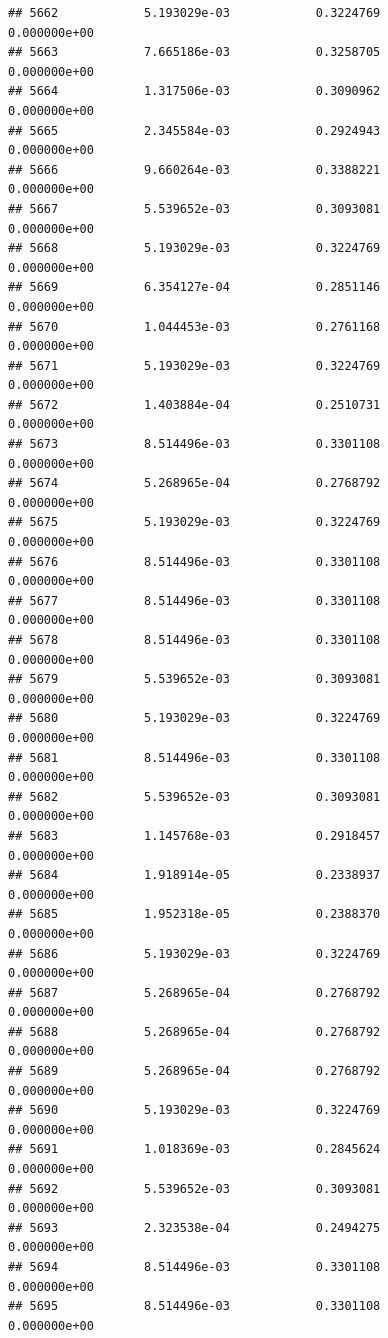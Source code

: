 \documentclass[
]{article}
\begin{document}
\begin{verbatim}
## 5662            5.193029e-03            0.3224769            0.000000e+00
## 5663            7.665186e-03            0.3258705            0.000000e+00
## 5664            1.317506e-03            0.3090962            0.000000e+00
## 5665            2.345584e-03            0.2924943            0.000000e+00
## 5666            9.660264e-03            0.3388221            0.000000e+00
## 5667            5.539652e-03            0.3093081            0.000000e+00
## 5668            5.193029e-03            0.3224769            0.000000e+00
## 5669            6.354127e-04            0.2851146            0.000000e+00
## 5670            1.044453e-03            0.2761168            0.000000e+00
## 5671            5.193029e-03            0.3224769            0.000000e+00
## 5672            1.403884e-04            0.2510731            0.000000e+00
## 5673            8.514496e-03            0.3301108            0.000000e+00
## 5674            5.268965e-04            0.2768792            0.000000e+00
## 5675            5.193029e-03            0.3224769            0.000000e+00
## 5676            8.514496e-03            0.3301108            0.000000e+00
## 5677            8.514496e-03            0.3301108            0.000000e+00
## 5678            8.514496e-03            0.3301108            0.000000e+00
## 5679            5.539652e-03            0.3093081            0.000000e+00
## 5680            5.193029e-03            0.3224769            0.000000e+00
## 5681            8.514496e-03            0.3301108            0.000000e+00
## 5682            5.539652e-03            0.3093081            0.000000e+00
## 5683            1.145768e-03            0.2918457            0.000000e+00
## 5684            1.918914e-05            0.2338937            0.000000e+00
## 5685            1.952318e-05            0.2388370            0.000000e+00
## 5686            5.193029e-03            0.3224769            0.000000e+00
## 5687            5.268965e-04            0.2768792            0.000000e+00
## 5688            5.268965e-04            0.2768792            0.000000e+00
## 5689            5.268965e-04            0.2768792            0.000000e+00
## 5690            5.193029e-03            0.3224769            0.000000e+00
## 5691            1.018369e-03            0.2845624            0.000000e+00
## 5692            5.539652e-03            0.3093081            0.000000e+00
## 5693            2.323538e-04            0.2494275            0.000000e+00
## 5694            8.514496e-03            0.3301108            0.000000e+00
## 5695            8.514496e-03            0.3301108            0.000000e+00

\end{verbatim}
\end{document}
